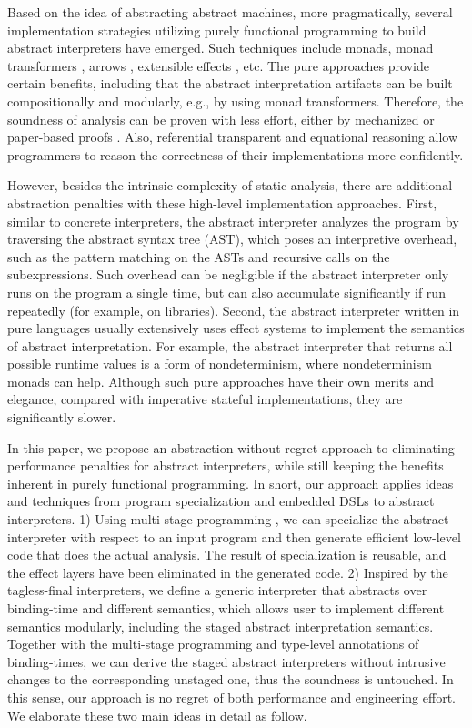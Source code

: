 Based on the idea of abstracting abstract machines, more
pragmatically, several implementation strategies utilizing purely
functional programming to build abstract interpreters have
emerged. Such techniques include monads, monad transformers
\cite{DBLP:journals/pacmpl/DaraisLNH17, Sergey:2013:MAI:2491956.2491979},
arrows \cite{Keidel:2018:CSP:3243631.3236767}, extensible effects
\cite{Githubsemantic}, etc.  The pure approaches provide certain
benefits, including that the abstract interpretation artifacts can be built
compositionally and modularly, e.g., by using monad
transformers. Therefore, the soundness of analysis can be proven with
less effort, either by mechanized \cite{Darais:2016:CGC:2951913.2951934}
or paper-based proofs \cite{Keidel:2018:CSP:3243631.3236767}. Also,
referential transparent and equational reasoning allow programmers to
reason the correctness of their implementations more confidently.

However, besides the intrinsic complexity of static analysis, there
are additional abstraction penalties with these high-level
implementation approaches.  First, similar to concrete interpreters,
the abstract interpreter analyzes the program by traversing the
abstract syntax tree (AST), which poses an interpretive overhead, such as
the pattern matching on the ASTs and recursive calls on the subexpressions.
Such overhead can be negligible if the abstract
interpreter only runs on the program a single time, but can also
accumulate significantly if run repeatedly (for example, on
libraries).  Second, the abstract interpreter written in pure languages
usually extensively uses effect systems to implement the semantics of
abstract interpretation.  For example, the abstract interpreter that
returns all possible runtime values is a form of nondeterminism, where
nondeterminism monads can help.  Although such pure approaches have
their own merits and elegance, compared with imperative stateful
implementations, they are significantly slower.

In this paper, we propose an abstraction-without-regret approach to
eliminating performance penalties for abstract interpreters,
while still keeping the benefits inherent in purely functional
programming.  In short, our approach applies ideas and techniques from
program specialization and embedded DSLs to abstract interpreters. 1)
Using multi-stage programming , we can specialize the abstract
interpreter with respect to an input program and then generate
efficient low-level code that does the actual analysis.  The result of
specialization is reusable, and the effect layers have been eliminated
in the generated code. 2) Inspired by the tagless-final interpreters,
we define a generic interpreter that abstracts over binding-time and
different semantics, which allows user to implement different
semantics modularly, including the staged abstract interpretation
semantics.  Together with the multi-stage programming and type-level
annotations of binding-times, we can derive the staged abstract
interpreters without intrusive changes to the corresponding unstaged
one, thus the soundness is untouched.  In this sense, our approach is
no regret of both performance and engineering effort. We elaborate
these two main ideas in detail as follow.

